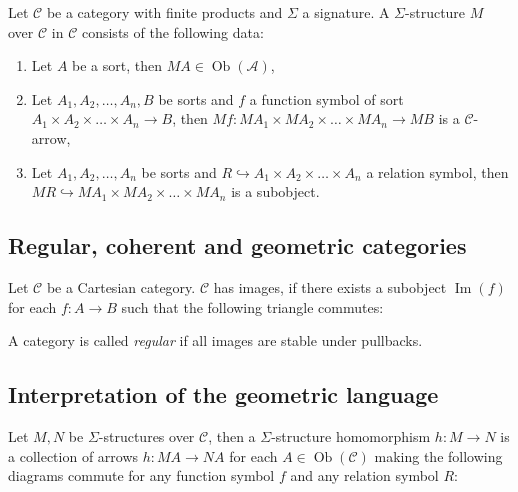 \documentclass[a4paper]{article}
\theoremstyle{defin}
\theoremstyle{theorem}
\theoremstyle{claim}
\theoremstyle{prop}
\theoremstyle{lemma}
\theoremstyle{fact}
\theoremstyle{ex}
\theoremstyle{col}
\begin{document}
\vspace{\baselineskip}

Let $\mathcal{C}$ be a category with finite products and $\Sigma$ a signature. A $\Sigma$-structure $M$ over $\mathcal{C}$ in $\mathcal{C}$ consists of the following data:
\begin{enumerate}
\item Let $A$ be a sort, then $M A \in \operatorname{Ob}(\mathcal{A})$,
\item Let $A_1, A_2, \dots, A_n, B$ be sorts and $f$ a function symbol of sort $A_1 \times A_2 \times \dots \times A_n \to B$, then $M f : M A_1 \times M A_2 \times \dots \times M A_n \to M B$ is a $\mathcal{C}$-arrow,
\item Let $A_1, A_2, \dots, A_n$ be sorts and $R \hookrightarrow A_1 \times A_2 \times \dots \times A_n$ a relation symbol, then $M R \hookrightarrow M A_1 \times M A_2 \times \dots \times M A_n$ is a subobject.
\end{enumerate}

\subsection{Regular, coherent and geometric categories}

Let $\mathcal{C}$ be a Cartesian category. $\mathcal{C}$ has images, if there exists a subobject
$\operatorname{Im}(f)$ for each $f : A \to B$ such that the following triangle commutes:

\centerline{
}

A category is called \emph{regular} if all images are stable under pullbacks.

\subsection{Interpretation of the geometric language}

Let $M, N$ be $\Sigma$-structures over $\mathcal{C}$, then a $\Sigma$-structure homomorphism $h : M \to N$ is a collection of arrows $h : M A \to N A$ for each $A \in \operatorname{Ob}(\mathcal{C})$ making the following diagrams commute for any function symbol $f$ and any relation symbol $R$:

\centerline{
}
\end{document}
